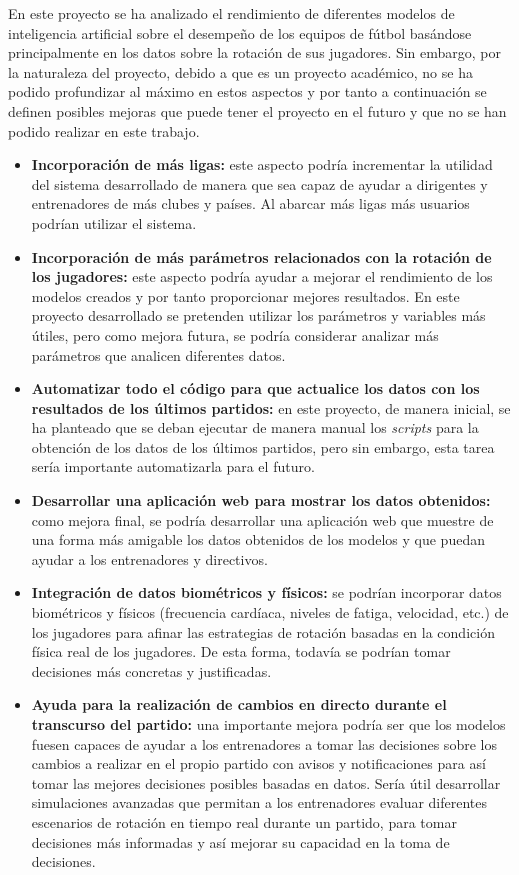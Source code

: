 En este proyecto se ha analizado el rendimiento de diferentes modelos de inteligencia artificial sobre el desempeño de los equipos de fútbol basándose principalmente en los datos sobre la rotación de sus jugadores. Sin embargo, por la naturaleza del proyecto, debido a que es un proyecto académico, no se ha podido profundizar al máximo en estos aspectos y por tanto a continuación se definen posibles mejoras que puede tener el proyecto en el futuro y que no se han podido realizar en este trabajo.
\begin{itemize}
    \item \textbf{Incorporación de más ligas: } este aspecto podría incrementar la utilidad del sistema desarrollado de manera que sea capaz de ayudar a dirigentes y entrenadores de más clubes y países. Al abarcar más ligas más usuarios podrían utilizar el sistema.
    \item \textbf{Incorporación de más parámetros relacionados con la rotación de los jugadores:} este aspecto podría ayudar a mejorar el rendimiento de los modelos creados y por tanto proporcionar mejores resultados. En este proyecto desarrollado se pretenden utilizar los parámetros y variables más útiles, pero como mejora futura, se podría considerar analizar más parámetros que analicen diferentes datos.
    \item \textbf{Automatizar todo el código para que actualice los datos con los resultados de los últimos partidos:} en este proyecto, de manera inicial, se ha planteado que se deban ejecutar de manera manual los \textit{scripts} para la obtención de los datos de los últimos partidos, pero sin embargo, esta tarea sería importante automatizarla para el futuro.
    \item \textbf{Desarrollar una aplicación web para mostrar los datos obtenidos:} como mejora final, se podría desarrollar una aplicación web que muestre de una forma más amigable los datos obtenidos de los modelos y que puedan ayudar a los entrenadores y directivos. 
    \item \textbf{Integración de datos biométricos y físicos:} se podrían incorporar datos biométricos y físicos (frecuencia cardíaca, niveles de fatiga, velocidad, etc.) de los jugadores para afinar las estrategias de rotación basadas en la condición física real de los jugadores. De esta forma, todavía se podrían tomar decisiones más concretas y justificadas.
    \item \textbf{Ayuda para la realización de cambios en directo durante el transcurso del partido:} una importante mejora podría ser que los modelos fuesen capaces de ayudar a los entrenadores a tomar las decisiones sobre los cambios a realizar en el propio partido con avisos y notificaciones para así tomar las mejores decisiones posibles basadas en datos. Sería útil desarrollar simulaciones avanzadas que permitan a los entrenadores evaluar diferentes escenarios de rotación en tiempo real durante un partido, para tomar decisiones más informadas y así mejorar su capacidad en la toma de decisiones.

\end{itemize}
